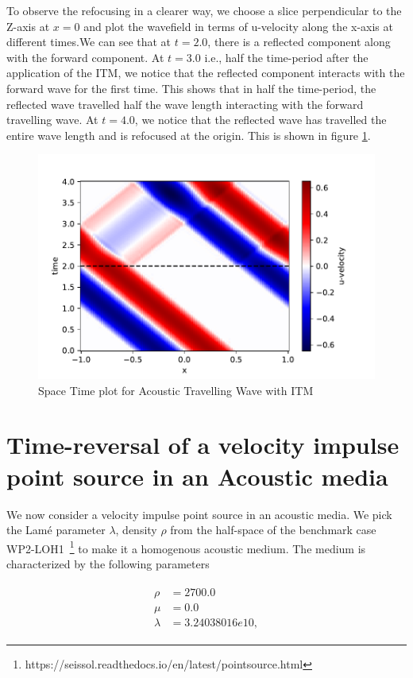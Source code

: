 To observe the refocusing in a clearer way, we choose a slice perpendicular to the Z-axis at $x=0$ and plot the wavefield in terms of u-velocity along the x-axis
at different times.We can see that at $t=2.0$, there is a reflected component along with the forward component. At $t=3.0$ i.e., half the time-period after
the application of the \ac{ITM}, we notice that the reflected component interacts with the forward wave for the first time. This shows that in half the time-period, the reflected wave travelled half the wave length interacting
with the forward travelling wave. At $t=4.0$, we notice that the reflected wave has travelled the entire wave length and is refocused at the origin. 
This is shown in figure \ref{fig:space-timeplot-travelling}.

\begin{figure}
    \centering
    \includegraphics[width=0.75\linewidth]{figures/space-time-plot-travelling.pdf}
    \caption{Space Time plot for Acoustic Travelling Wave with \ac{ITM}}
    \label{fig:space-timeplot-travelling}
\end{figure}

\section{Time-reversal of a velocity impulse point source in an Acoustic media} \label{sec:acousticITM}

We now consider a velocity impulse point source in an acoustic media. We pick the Lam\'{e} parameter $\lambda$, density $\rho$ 
from the half-space of the benchmark case WP2-LOH1~\footnote[1]{https://seissol.readthedocs.io/en/latest/pointsource.html} to make it a homogenous acoustic medium. 
The medium is characterized by the following parameters

\begin{align}
    \begin{split}
        \rho &=    2700.0 \\
        \mu &=     0.0 \\
        \lambda &= 3.24038016e10 ,
    \end{split}
\end{align}

